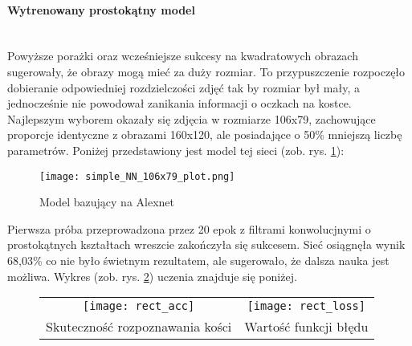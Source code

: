 \paragraph{Wytrenowany prostokątny model} \mbox{}\\
Powyższe porażki oraz wcześniejsze sukcesy na kwadratowych obrazach sugerowały, że
obrazy mogą mieć za duży rozmiar. To przypuszczenie rozpoczęło dobieranie
odpowiedniej rozdzielczości zdjęć tak by rozmiar był mały, a jednocześnie nie powodował
zanikania informacji o oczkach na kostce. Najlepszym wyborem okazały się zdjęcia w rozmiarze 106x79,
zachowujące proporcje identyczne z obrazami 160x120, ale posiadające o 50\% mniejszą liczbę parametrów.
Poniżej przedstawiony jest model tej sieci (zob. rys. \ref{fig:simple_106x79}):
\newpage
\begin{figure}[h!]
\centering
\texttt{[image: simple\_NN\_106x79\_plot.png]}
\caption{Model bazujący na Alexnet}
\label{fig:simple_106x79}
\end{figure}
Pierwsza próba przeprowadzona przez 20 epok z filtrami konwolucjnymi o prostokątnych
kształtach wreszcie zakończyła się sukcesem. Sieć osiągnęła wynik 68,03\% co nie
było świetnym rezultatem, ale sugerowało, że dalsza nauka jest możliwa. Wykres (zob. rys. \ref{fig:rect_learned}) uczenia znajduje się poniżej.\\

\begin{figure}[h!]
\begin{center}
\begin{tabular}{cc}
\texttt{[image: rect\_acc]} &
\texttt{[image: rect\_loss]} \\
 Skuteczność rozpoznawania kości & Wartość funkcji błędu\\
\end{tabular}
\label{fig:rect_learned}
\end{center}
\end{figure}

